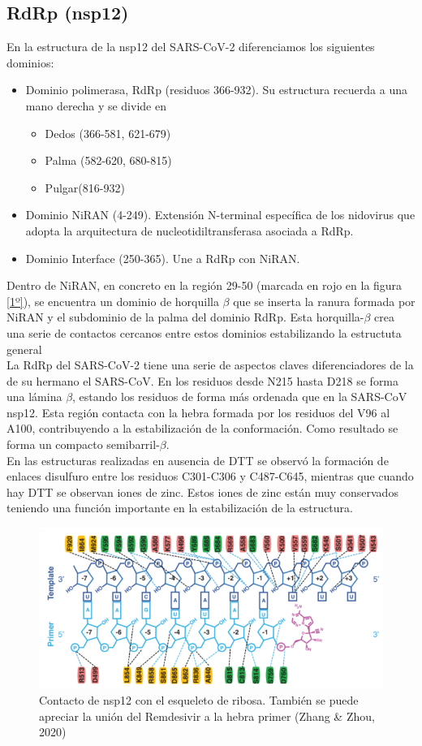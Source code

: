\documentclass[a4paper,11pt]{report}
\begin{document}
 \subsection{RdRp (nsp12)}
 En la estructura de la nsp12 del SARS-CoV-2 diferenciamos los siguientes dominios:
 \begin{itemize}
 	\item Dominio polimerasa, RdRp (residuos 366-932). Su estructura recuerda a una mano derecha y se divide en
 	\begin{itemize}
 		\item Dedos (366-581, 621-679)
 		\item Palma (582-620, 680-815)
 		\item Pulgar(816-932)
 	\end{itemize} 
 	\item Dominio NiRAN (4-249). Extensión N-terminal específica de los nidovirus que adopta la arquitectura de nucleotidiltransferasa asociada a RdRp.
 	\item Dominio Interface (250-365). Une a RdRp con NiRAN.
 \end{itemize} 
Dentro de NiRAN, en concreto en la región 29-50 (marcada en rojo en la figura \ref{1º}), se encuentra un dominio de horquilla $\beta$ que se inserta la ranura formada por NiRAN y el subdominio de la palma del dominio RdRp. Esta horquilla-$\beta$ crea una serie de contactos cercanos entre estos dominios estabilizando la estructuta general\\

La RdRp del SARS-CoV-2 tiene una serie de aspectos claves diferenciadores de la de su hermano el SARS-CoV. En los residuos desde N215 hasta D218 se forma una lámina $\beta$, estando los residuos de forma más ordenada que en la SARS-CoV nsp12. Esta región contacta con la hebra formada por los residuos del V96 al A100, contribuyendo a la estabilización de la conformación. Como resultado se forma un compacto semibarril-$\beta$. \\
En las estructuras realizadas en ausencia de DTT se observó la formación de enlaces disulfuro entre los residuos C301-C306 y C487-C645, mientras que cuando hay DTT se observan iones de zinc. Estos iones de zinc están muy conservados teniendo una función importante en la estabilización de la estructura.

 \begin{figure}
	\includegraphics[width=\linewidth]{Figuras/Figura45}
	\caption{Contacto de nsp12 con el esqueleto de ribosa. También se puede apreciar la unión del Remdesivir a la hebra primer (Zhang \& Zhou, 2020)}
	\label{fig: contremde}
\end{figure}
\end{document}
